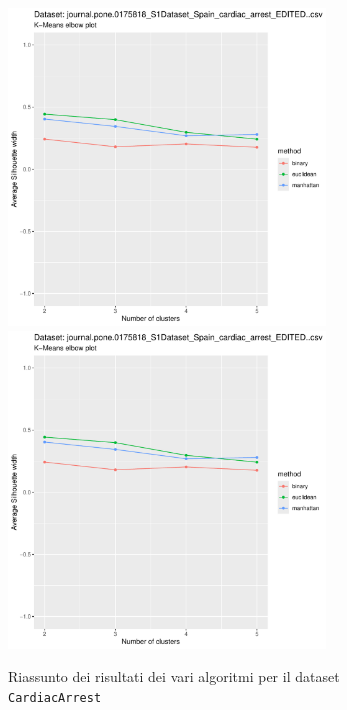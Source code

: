 \documentclass[a4paper, 12pt]{report}
\begin{document}
			\begin{figure}[H]
				\centering
				\includegraphics[width = 0.75\textwidth, height = 0.45\textheight, page = 9]{
					results/results_CardiacArrest.csv.pdf
				}
				\includegraphics[width = 0.75\textwidth, height = 0.45\textheight, page = 10]{
					results/results_CardiacArrest.csv.pdf
				}
				\caption{Riassunto dei risultati dei vari algoritmi per il dataset
				\texttt{CardiacArrest}}
				\label{fig:comp2}
			\end{figure}
\end{document}

